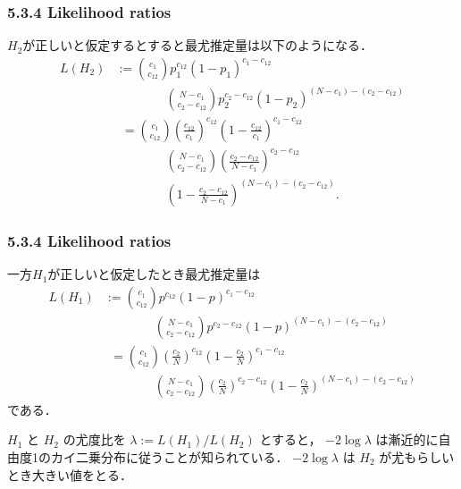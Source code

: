 \documentclass[10pt,leqno]{beamer}
\begin{document}
\begin{frame}
    \frametitle{5.3.4 Likelihood ratios}
    $H_2$が正しいと仮定するとすると最尤推定量は以下のようになる．
    \begin{align*}
        L(H_2) &:= \binom{c_1}{c_{12}}p_1^{c_{12}}(1 - p_1)^{c_1 - c_{12}}
        \\
        &\qquad \qquad \binom{ N - c_1}{c_2 - c_{12}}p_2^{c_2 - c_{12}}(1 - p_2)^{(N - c_1) - (c_2 - c_{12})} \\
        & \phantom{:} = \binom{c_1}{c_{12}}\left(\frac{c_{12}}{c_1}\right)^{c_{12}}\left(1 - \frac{c_{12}}{c_1}\right)^{c_1 - c_{12}} \\
        & \qquad \qquad \binom{ N - c_1}{c_2 - c_{12}}\left(\frac{c_2 - c_{12}}{N - c_1}\right)^{c_2 - c_{12}}
        \\
        & \qquad \qquad \left(1 - \frac{c_2 - c_{12}}{N - c_1}\right)^{(N - c_1) - (c_2 - c_{12})}.
    \end{align*}
\end{frame}
\begin{frame}
    \frametitle{5.3.4 Likelihood ratios}
    一方$H_1$が正しいと仮定したとき最尤推定量は
    \begin{align*}
        L(H_1) &:= \binom{c_1}{c_{12}}p^{c_{12}}(1 - p)^{c_1 - c_{12}}
        \\
        & \qquad \qquad \binom{ N - c_1}{c_2 - c_{12}}p^{c_2 - c_{12}}(1 - p)^{(N - c_1) - (c_2 - c_{12})} \\
        &\phantom{:}= \binom{c_1}{c_{12}}\left(\frac{c_2}{N}\right)^{c_{12}}\left(1 - \frac{c_2}{N}\right)^{c_1 - c_{12}} \\
        & \qquad \qquad \binom{ N - c_1}{c_2 - c_{12}}\left(\frac{c_2}{N}\right)^{c_2 - c_{12}}\left(1 - \frac{c_2}{N}\right)^{(N - c_1) - (c_2 - c_{12})}
    \end{align*}
    である．

    \bigskip

    $H_1$ と $H_2$ の尤度比を $\lambda := L(H_1) / L(H_2)$ とすると，
    $-2 \log \lambda$ は漸近的に自由度1のカイ二乗分布に従うことが知られている．
    $-2 \log \lambda$ は $H_2$ が尤もらしいとき大きい値をとる．
\end{frame}
\end{document}
